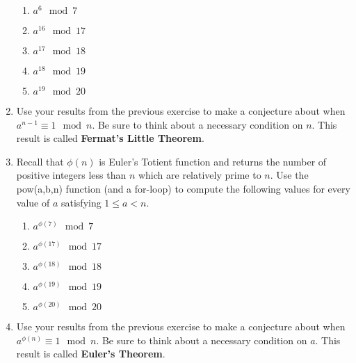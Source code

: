 \documentclass[12pt]{amsart}
\theoremstyle{definition}
\theoremstyle{remark}
\numberwithin{equation}{section}
\begin{document}
\begin{enumerate}
\begin{enumerate}
\item $a^{6}\mod 7$
\item $a^{16}\mod 17$
\item $a^{17}\mod 18$
\item $a^{18}\mod 19$
\item $a^{19}\mod 20$
\end{enumerate}
\item Use your results from the previous exercise to make a conjecture about when $a^{n-1} \equiv 1\mod n$. Be sure to think about a necessary condition on $n$. This result is called {\bf Fermat's Little Theorem}.
\item Recall that $\phi(n)$ is Euler's Totient function and returns the number of positive integers less than $n$ which are relatively prime to $n$. Use the pow(a,b,n) function (and a for-loop) to compute the following values for every value of $a$ satisfying $1\leq a< n$. 
\begin{enumerate}
\item $a^{\phi(7)}\mod 7$
\item $a^{\phi(17)}\mod 17$
\item $a^{\phi(18)}\mod 18$
\item $a^{\phi(19)}\mod 19$
\item $a^{\phi(20)}\mod 20$
\end{enumerate}
\item Use your results from the previous exercise to make a conjecture about when $a^{\phi(n)} \equiv 1\mod n$. Be sure to think about a necessary condition on $a$. This result is called {\bf Euler's Theorem}.
\end{enumerate}
\end{document}
